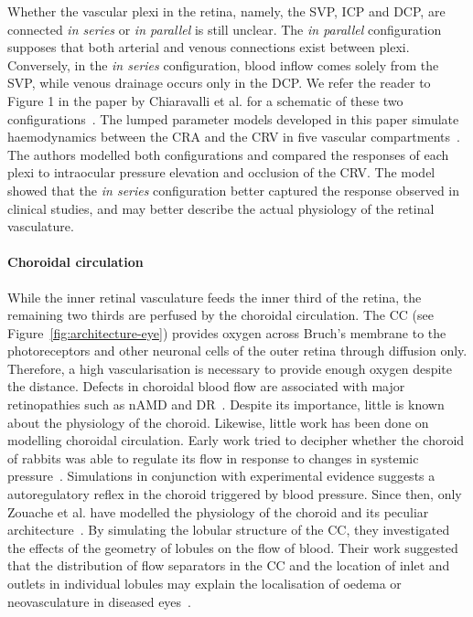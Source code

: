 \documentclass{article}
\begin{document}
Whether the vascular plexi in the retina, namely, the SVP, ICP and DCP, are connected \textit{in series} or \textit{in parallel} is still unclear.
The \textit{in parallel} configuration supposes that both arterial and venous connections exist between plexi.
Conversely, in the \textit{in series} configuration, blood inflow comes solely from the SVP, while venous drainage occurs only in the DCP.
We refer the reader to Figure 1 in the paper by Chiaravalli et al. for a schematic of these two configurations~\cite{Chiaravalli_2021}.
The lumped parameter models developed in this paper simulate haemodynamics between the CRA and the CRV in five vascular compartments~\cite{Chiaravalli_2021}.
The authors modelled both configurations and compared the responses of each plexi to intraocular pressure elevation and occlusion of the CRV.
The model showed that the \textit{in series} configuration better captured the response observed in clinical studies, and may better describe the actual physiology of the retinal vasculature.

\paragraph*{Choroidal circulation}
While the inner retinal vasculature feeds the inner third of the retina, the remaining two thirds are perfused by the choroidal circulation.
The CC (see Figure~\ref{fig:architecture-eye}) provides oxygen across Bruch's membrane to the photoreceptors and other neuronal cells of the outer retina through diffusion only.
Therefore, a high vascularisation is necessary to provide enough oxygen despite the distance.
Defects in choroidal blood flow are associated with major retinopathies such as nAMD and DR~\cite{Pemp_2008}.
Despite its importance, little is known about the physiology of the choroid.
Likewise, little work has been done on modelling choroidal circulation.
Early work tried to decipher whether the choroid of rabbits was able to regulate its flow in response to changes in systemic pressure~\cite{Kiel_1992}.
Simulations in conjunction with experimental evidence suggests a autoregulatory reflex in the choroid triggered by blood pressure.
Since then, only Zouache et al. have modelled the physiology of the choroid and its peculiar architecture~\cite{Zouache_2015,Zouache_2016}.
By simulating the lobular structure of the CC, they investigated the effects of the geometry of lobules on the flow of blood.
Their work suggested that the distribution of flow separators in the CC and the location of inlet and outlets in individual lobules may explain the localisation of oedema or neovasculature in diseased eyes~\cite{Zouache_2015}.
\end{document}
